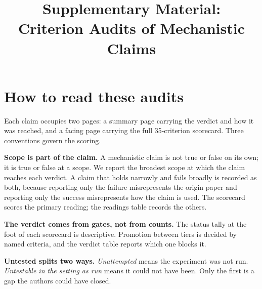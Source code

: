 \documentclass{article}
\title{Supplementary Material:\\Criterion Audits of Mechanistic Claims}
\author{}
\begin{document}
\maketitle

\section*{How to read these audits}

Each claim occupies two pages: a summary page carrying the verdict and how it was reached,
and a facing page carrying the full 35-criterion scorecard. Three conventions govern the
scoring.

\textbf{Scope is part of the claim.} A mechanistic claim is not true or false on its own;
it is true or false at a scope. We report the broadest scope at which the claim reaches
each verdict. A claim that holds narrowly and fails broadly is recorded as both, because
reporting only the failure misrepresents the origin paper and reporting only the success
misrepresents how the claim is used. The scorecard scores the primary reading; the readings table records the others.

\textbf{The verdict comes from gates, not from counts.} The status tally at the foot of
each scorecard is descriptive. Promotion between tiers is decided by named criteria, and
the verdict table reports which one blocks it.

\textbf{Untested splits two ways.} \emph{Unattempted} means the experiment was not run.
\emph{Untestable in the setting as run} means it could not have been. Only the first is a
gap the authors could have closed.
















\end{document}
